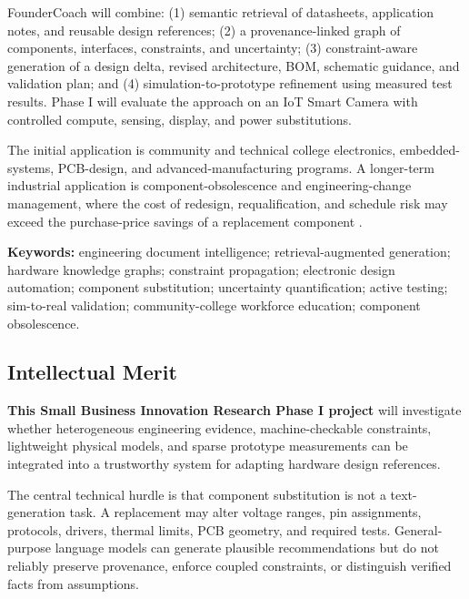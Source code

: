 \documentclass[12pt,letterpaper]{article}
\begin{document}
FounderCoach will combine: (1) semantic retrieval of datasheets, application notes, and reusable design references; (2) a provenance-linked graph of components, interfaces, constraints, and uncertainty; (3) constraint-aware generation of a design delta, revised architecture, BOM, schematic guidance, and validation plan; and (4) simulation-to-prototype refinement using measured test results. Phase I will evaluate the approach on an IoT Smart Camera with controlled compute, sensing, display, and power substitutions.

The initial application is community and technical college electronics, embedded-systems, PCB-design, and advanced-manufacturing programs. A longer-term industrial application is component-obsolescence and engineering-change management, where the cost of redesign, requalification, and schedule risk may exceed the purchase-price savings of a replacement component \cite{sd22_2024}.

\textbf{Keywords:} engineering document intelligence; retrieval-augmented generation; hardware knowledge graphs; constraint propagation; electronic design automation; component substitution; uncertainty quantification; active testing; sim-to-real validation; community-college workforce education; component obsolescence.

\subsection{Intellectual Merit}

\textbf{This Small Business Innovation Research Phase I project} will investigate whether heterogeneous engineering evidence, machine-checkable constraints, lightweight physical models, and sparse prototype measurements can be integrated into a trustworthy system for adapting hardware design references.

The central technical hurdle is that component substitution is not a text-generation task. A replacement may alter voltage ranges, pin assignments, protocols, drivers, thermal limits, PCB geometry, and required tests. General-purpose language models can generate plausible recommendations but do not reliably preserve provenance, enforce coupled constraints, or distinguish verified facts from assumptions.
\end{document}
